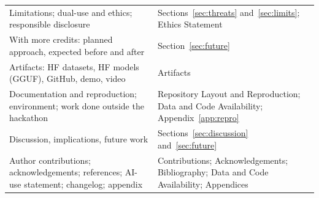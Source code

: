 \begin{table}[htbp]
\begin{tabular}{>{\raggedright\arraybackslash}p{5.3cm}>{\raggedright\arraybackslash}p{6.3cm}}
Limitations; dual-use and ethics; responsible disclosure & Sections~\ref{sec:threats} and~\ref{sec:limits}; Ethics Statement \\
With more credits: planned approach, expected before and after & Section~\ref{sec:future} \\
Artifacts: HF datasets, HF models (GGUF), GitHub, demo, video & Artifacts \\
Documentation and reproduction; environment; work done outside the hackathon & Repository Layout and Reproduction; Data and Code Availability; Appendix~\ref{app:repro} \\
Discussion, implications, future work & Sections~\ref{sec:discussion} and~\ref{sec:future} \\
Author contributions; acknowledgements; references; AI-use statement; changelog; appendix & Contributions; Acknowledgements; Bibliography; Data and Code Availability; Appendices \\
\bottomrule
\end{tabular}
\end{table}
